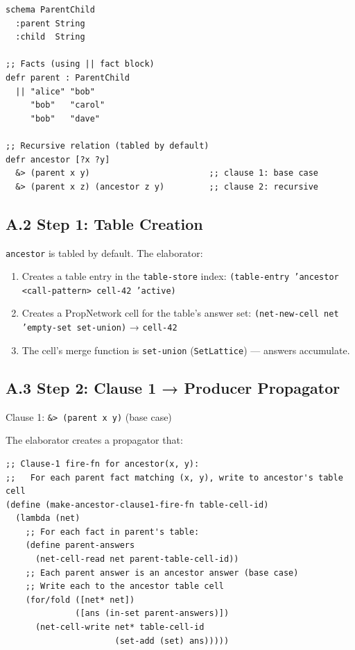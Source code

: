 \documentclass[11pt]{article}
\begin{document}
\begin{verbatim}
schema ParentChild
  :parent String
  :child  String

;; Facts (using || fact block)
defr parent : ParentChild
  || "alice" "bob"
     "bob"   "carol"
     "bob"   "dave"

;; Recursive relation (tabled by default)
defr ancestor [?x ?y]
  &> (parent x y)                        ;; clause 1: base case
  &> (parent x z) (ancestor z y)         ;; clause 2: recursive
\end{verbatim}
\subsection{A.2 Step 1: Table Creation}
\label{sec:org943fa2a}

\texttt{ancestor} is tabled by default. The elaborator:

\begin{enumerate}
\item Creates a table entry in the \texttt{table-store} index:
\texttt{(table-entry 'ancestor <call-pattern> cell-42 'active)}
\item Creates a PropNetwork cell for the table's answer set:
\texttt{(net-new-cell net 'empty-set set-union)}  → \texttt{cell-42}
\item The cell's merge function is \texttt{set-union} (\texttt{SetLattice}) — answers accumulate.
\end{enumerate}
\subsection{A.3 Step 2: Clause 1 → Producer Propagator}
\label{sec:org176c8f2}

Clause 1: \texttt{\&> (parent x y)} (base case)

The elaborator creates a propagator that:

\begin{verbatim}
;; Clause-1 fire-fn for ancestor(x, y):
;;   For each parent fact matching (x, y), write to ancestor's table cell
(define (make-ancestor-clause1-fire-fn table-cell-id)
  (lambda (net)
    ;; For each fact in parent's table:
    (define parent-answers
      (net-cell-read net parent-table-cell-id))
    ;; Each parent answer is an ancestor answer (base case)
    ;; Write each to the ancestor table cell
    (for/fold ([net* net])
              ([ans (in-set parent-answers)])
      (net-cell-write net* table-cell-id
                      (set-add (set) ans)))))
\end{verbatim}
\end{document}

